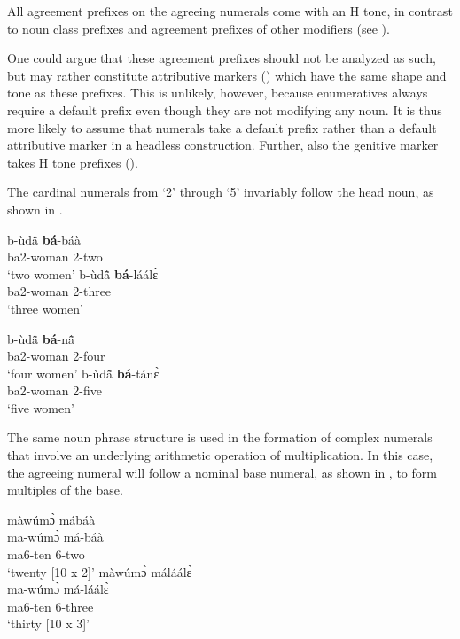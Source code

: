 All agreement prefixes on the agreeing numerals come with an H tone, in contrast to noun class prefixes and agreement prefixes of other modifiers (see ).

One could argue that these agreement prefixes should not be analyzed as such, but may rather constitute attributive markers () which have the same shape and tone as these prefixes. This is unlikely, however, because enumeratives always require a default prefix even though they are not modifying any noun. It is thus more likely to assume that numerals take a default prefix rather than a default attributive marker in a headless construction. Further, also the genitive marker takes H tone prefixes ().

The cardinal numerals from `2' through `5'  invariably follow the head noun, as shown in .

\ea \label {ModNum1}
    \ea  \gll b-ùdã̂ {\bfseries bá}-báà\\
    ba2-woman 2-two \\
    \glt  `two women'
    \ex \gll
    b-ùdã̂ {\bfseries bá}-láálɛ̀ \\
    ba2-woman 2-three \\
    \glt  `three women'


    \ex
    \gll    b-ùdã̂ {\bfseries bá}-nã̂\\
    ba2-woman 2-four \\
    \glt `four women'
     \ex
     \gll    b-ùdã̂ {\bfseries bá}-tánɛ̀ \\
    ba2-woman 2-five \\
    \glt  `five women'
    \z
\z

The same noun phrase structure is used in the formation of complex numerals that involve an underlying arithmetic operation of multiplication. In this case, the agreeing numeral will follow a nominal base numeral, as shown in , to form multiples of the base.

\ea \label {ModNum2}
\ea  \glll màwúmɔ̀ mábáà\\
ma-wúmɔ̀ má-báà\\
ma6-ten 6-two \\
\glt `twenty [10 x 2]'
 \ex \glll màwúmɔ̀ máláálɛ̀ \\
ma-wúmɔ̀ má-láálɛ̀ \\
   ma6-ten 6-three \\
\glt `thirty [10 x 3]'

